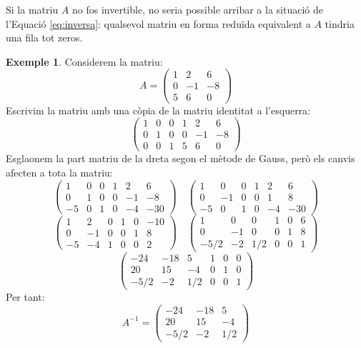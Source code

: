 \documentclass[a4paper,12pt,twoside]{article}
\newcommand{\1}{\mathbf{1}}
\newcommand{\0}{\mathbf{0}}
\theoremstyle{definition}
\newtheorem{exemple}[teorema]{Exemple}
\theoremstyle{remark}
\begin{document}
Si la matriu $A$ no fos invertible, no seria possible arribar a la situació de l'Equació \eqref{eq:inversa}: qualsevol matriu en forma reduïda equivalent a $A$ tindria una fila tot zeros.
\begin{exemple}
Considerem la matriu:
$$
A=\begin{pmatrix}
1 & 2 & 6 \\ 0 & -1 & -8 \\ 5 & 6 & 0
\end{pmatrix}
$$
Escrivim la matriu amb una còpia de la matriu identitat a l'esquerra:
$$
\left(\begin{array}{ccc|ccc}
1 & 0 & 0 & 1 & 2 & 6 \\
0 & 1 & 0 & 0 & -1 & -8 \\
0 & 0 & 1 & 5 & 6 & 0
\end{array}\right)
$$
Esglaonem la part matriu de la dreta segon el mètode de Gauss, però els canvis afecten a tota la matriu:
$$
\left(\begin{array}{ccc|ccc}
1 & 0 & 0 & 1 & 2 & 6 \\
0 & 1 & 0 & 0 & -1 & -8 \\
-5 & 0 & 1 & 0 & -4 & -30
\end{array}\right)
\quad
\left(\begin{array}{ccc|ccc}
1 & 0 & 0 & 1 & 2 & 6 \\
0 & -1 & 0 & 0 & 1 & 8 \\
-5 & 0 & 1 & 0 & -4 & -30
\end{array}\right)
$$
$$
\left(\begin{array}{ccc|ccc}
1 & 2 & 0 & 1 & 0 & -10 \\
0 & -1 & 0 & 0 &1 & 8 \\
-5 & -4 & 1 & 0 & 0 & 2
\end{array}\right)
\quad
\left(\begin{array}{ccc|ccc}
1 & 0 & 0 & 1 & 0 & 6 \\
0 & -1 & 0 & 0 & 1 & 8 \\
-5/2 & -2 & 1/2 & 0 & 0 & 1
\end{array}\right)
$$
$$
\left(\begin{array}{ccc|ccc}
-24 & -18 & 5 & 1 & 0 & 0 \\
20 & 15 & -4 & 0 & 1 & 0 \\
-5/2 & -2 & 1/2 & 0 & 0 & 1
\end{array}\right)
$$
Per tant:
$$
A^{-1}=\begin{pmatrix}
-24 & -18 & 5 \\
20 & 15 & -4 \\
-5/2 & -2 & 1/2
\end{pmatrix}
$$

\end{exemple}
\end{document}
